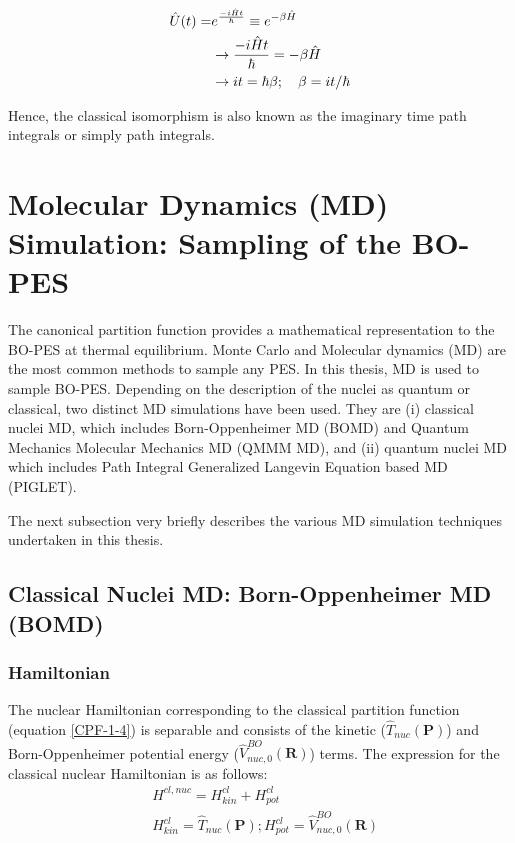 \begin{align}
    \label{QPF-9}
    \hat{U}(t)=&e^{\frac{-i\hat{H}t}{\hbar}}\equiv e^{-\beta \hat{H}}\notag\\
    &\rightarrow \frac{-i\hat{H}t}{\hbar} =-\beta \hat{H}\notag\\
    &\rightarrow it= \hbar\beta; \quad \beta = it/\hbar
\end{align}

\noindent Hence, the classical isomorphism is also known as the imaginary time path integrals or simply path integrals. 

\section{Molecular Dynamics (MD) Simulation: Sampling of the BO-PES}
\label{MD}
\noindent The  canonical partition function provides a mathematical representation to the BO-PES at thermal equilibrium. Monte Carlo and Molecular dynamics (MD) are the most common methods to sample any PES. In this thesis, MD is used to sample BO-PES. Depending on the description of the nuclei as quantum or classical, two distinct MD simulations have been used. They are (i) classical nuclei MD, which includes Born-Oppenheimer MD (BOMD) and Quantum Mechanics Molecular Mechanics MD (QMMM MD), and (ii) quantum nuclei MD which includes Path Integral Generalized Langevin Equation based MD\cite{ceriotti2012efficient} (PIGLET). 

\noindent The next subsection very briefly describes the various MD simulation techniques undertaken in this thesis.          

\subsection{Classical Nuclei MD: Born-Oppenheimer MD (BOMD)}

\subsubsection*{Hamiltonian}

\noindent The nuclear Hamiltonian corresponding to the classical partition function (equation \ref{CPF-1-4}) is  separable and consists of the kinetic ($\hat{T}_{nuc}(\textbf{P})$) and Born-Oppenheimer potential energy ($\hat{V}^{BO}_{nuc,0}(\textbf{R})$) terms. The expression for the classical nuclear Hamiltonian is as follows: 
\begin{align}
    \label{BOMD-1}
    &H^{cl,nuc}=H^{cl}_{kin}+H^{cl}_{pot}\\
    &H^{cl}_{kin}=\hat{T}_{nuc}(\textbf{P}); H^{cl}_{pot}=\hat{V}^{BO}_{nuc,0}(\textbf{R})
\end{align}

